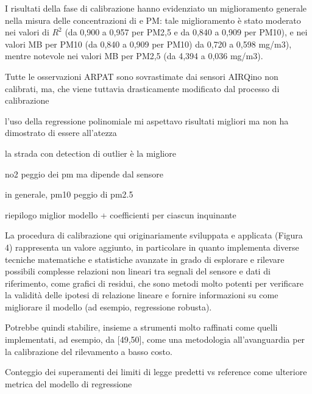 I risultati della fase di calibrazione hanno evidenziato un miglioramento generale nella misura delle concentrazioni di  e PM: tale miglioramento è stato moderato nei valori di $R^2$ (da 0,900 a 0,957 per PM2,5 e da 0,840 a 0,909 per PM10), e nei valori MB per PM10 (da 0,840 a 0,909 per PM10) da 0,720 a 0,598 mg/m3), mentre notevole nei valori MB per PM2,5 (da 4,394 a 0,036 mg/m3).

Tutte le osservazioni ARPAT sono sovrastimate dai sensori AIRQino non calibrati, ma, che viene tuttavia drasticamente modificato dal processo di calibrazione

l'uso della regressione polinomiale mi aspettavo risultati migliori ma non ha dimostrato di essere all'atezza

la strada con detection di outlier è la migliore

no2 peggio dei pm ma dipende dal sensore

in generale, pm10 peggio di pm2.5

riepilogo miglior modello + coefficienti per ciascun inquinante

La procedura di calibrazione qui originariamente sviluppata e applicata (Figura 4) rappresenta un valore aggiunto, in particolare in quanto implementa diverse tecniche matematiche e statistiche avanzate in grado di esplorare e rilevare possibili complesse relazioni non lineari tra segnali del sensore e dati di riferimento, come grafici di residui, che sono metodi molto potenti per verificare la validità delle ipotesi di relazione lineare e fornire informazioni su come migliorare il modello (ad esempio, regressione robusta).

Potrebbe quindi stabilire, insieme a strumenti molto raffinati come quelli implementati, ad esempio, da [49,50], come una metodologia all'avanguardia per la calibrazione del rilevamento a basso costo.

Conteggio dei superamenti dei limiti di legge predetti vs reference come ulteriore metrica del modello di regressione



